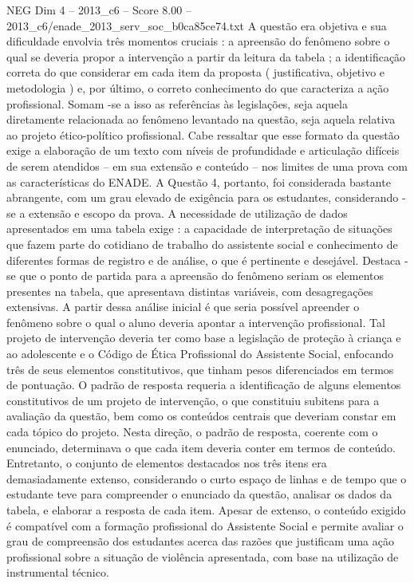 \begin{textsample}{NEG Dim 4 – 2013\_c6 – Score 8.00 – 2013\_c6/enade\_2013\_serv\_soc\_b0ca85ce74.txt}
A questão era objetiva e sua dificuldade envolvia três momentos cruciais : a apreensão do fenômeno sobre o qual se deveria propor a intervenção a partir da leitura da tabela ; a identificação correta do que considerar em cada item da proposta ( justificativa, objetivo e metodologia ) e, por último, o correto conhecimento do que caracteriza a ação profissional.
Somam -se a isso as referências às legislações, seja aquela diretamente relacionada ao fenômeno levantado na questão, seja aquela relativa ao projeto ético-político profissional.
Cabe ressaltar que esse formato da questão exige a elaboração de um texto com níveis de profundidade e articulação difíceis de serem atendidos – em sua extensão e conteúdo – nos limites de uma prova com as características do ENADE.
A Questão 4, portanto, foi considerada bastante abrangente, com um grau elevado de exigência para os estudantes, considerando -se a extensão e escopo da prova.
A necessidade de utilização de dados apresentados em uma tabela exige : a capacidade de interpretação de situações que fazem parte do cotidiano de trabalho do assistente social e conhecimento de diferentes formas de registro e de análise, o que é pertinente e desejável.
Destaca -se que o ponto de partida para a apreensão do fenômeno seriam os elementos presentes na tabela, que apresentava distintas variáveis, com desagregações extensivas.
A partir dessa análise inicial é que seria possível apreender o fenômeno sobre o qual o aluno deveria apontar a intervenção profissional.
Tal projeto de intervenção deveria ter como base a legislação de proteção à criança e ao adolescente e o Código de Ética Profissional do Assistente Social, enfocando três de seus elementos constitutivos, que tinham pesos diferenciados em termos de pontuação.
O padrão de resposta requeria a identificação de alguns elementos constitutivos de um projeto de intervenção, o que constituiu subitens para a avaliação da questão, bem como os conteúdos centrais que deveriam constar em cada tópico do projeto.
Nesta direção, o padrão de resposta, coerente com o enunciado, determinava o que cada item deveria conter em termos de conteúdo.
Entretanto, o conjunto de elementos destacados nos três itens era demasiadamente extenso, considerando o curto espaço de linhas e de tempo que o estudante teve para compreender o enunciado da questão, analisar os dados da tabela, e elaborar a resposta de cada item.
Apesar de extenso, o conteúdo exigido é compatível com a formação profissional do Assistente Social e permite avaliar o grau de compreensão dos estudantes acerca das razões que justificam uma ação profissional sobre a situação de violência apresentada, com base na utilização de instrumental técnico.

\end{textsample}
